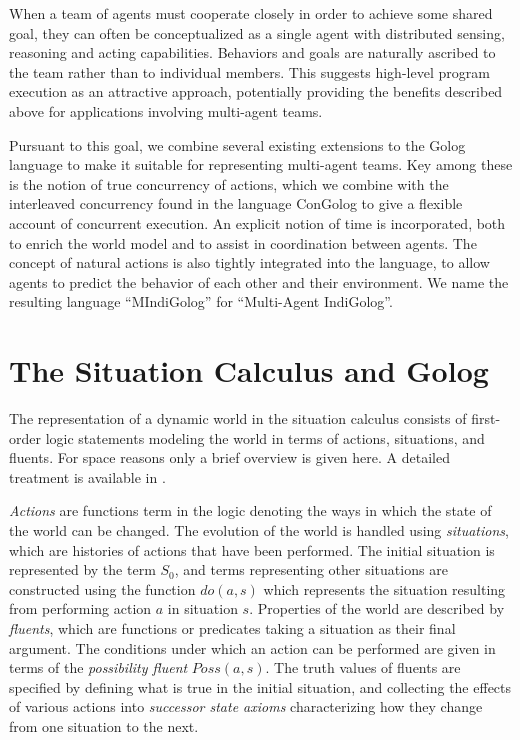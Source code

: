 \documentclass{llncs}
\begin{document}
When a team of agents must cooperate closely in order to achieve some
shared goal, they can often be conceptualized as a single agent with
distributed sensing, reasoning and acting capabilities. Behaviors
and goals are naturally ascribed to the team rather than to individual
members.
This suggests high-level program execution as an attractive
approach, potentially providing the benefits described above for applications
involving multi-agent teams.

Pursuant to this goal, we combine several existing extensions to the
Golog language to make it suitable for representing multi-agent teams.
Key among these is the notion of true concurrency of actions, which
we combine with the interleaved concurrency found in the language
ConGolog to give a flexible account of concurrent
execution. An explicit notion of time is incorporated, both to enrich
the world model and to assist in coordination between agents. The
concept of natural actions is also tightly
integrated into the language, to allow agents to predict the behavior
of each other and their environment. We name the resulting language
``MIndiGolog'' for ``Multi-Agent IndiGolog''.

\section{The Situation Calculus and Golog}

The representation of a dynamic world in the situation calculus consists
of first-order logic statements modeling the world in terms of actions,
situations, and fluents.
For space reasons only a brief overview is given here.
A detailed treatment
is available in \cite{pirri99contributions_sitcalc}.

\emph{Actions} are functions term in the logic denoting the ways
in which the state of the world can be changed.
The evolution of the world is handled using \emph{situations}, which
are histories of actions that have been performed. The initial situation
is represented by the term $S_{0}$, and terms representing other situations
are constructed using the function $do(a,s)$ which represents the
situation resulting from performing action $a$ in situation $s$.
Properties of the world are described by \emph{fluents}, which are
functions or predicates taking a situation as their final argument.
The conditions under which an action can be performed are given in
terms of the \emph{possibility fluent} $Poss(a,s)$. The truth values
of fluents are specified by defining what is true in the initial situation,
and collecting the effects of various actions into \emph{successor
state axioms} characterizing how they change from one situation to
the next.
\end{document}
